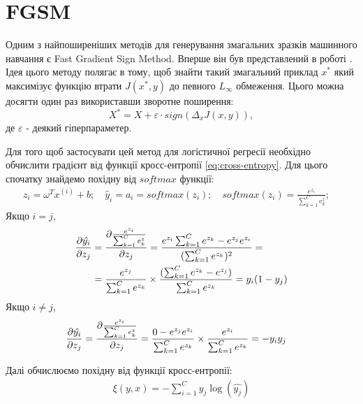 \documentclass[a4paper,14pt]{extreport}
\newcommand{\tran}{^{T}}
\newcommand{\ith}{^{(i)}}
\begin{document}
	\section{FGSM}
	Одним з найпоширеніших методів для генерування змагальних зразків машинного навчання є Fast Gradient Sign Method. Вперше він був представлений в роботі \textcite{goodfellow2014explaining}. Ідея цього методу полягає в тому, щоб знайти такий змагальний приклад $x^{*}$ який максимізує функцію втрати $J(x^{*}, y)$ до певного $L_{\infty}$ обмеження. Цього можна досягти один раз використавши зворотне поширення:
	\begin{equation}
	X^{*} = X + \varepsilon \cdot sign(\Delta_x J(x, y)),
	\end{equation}
	де $\varepsilon$ - деякий гіперпараметер.
	
	Для того щоб застосувати цей метод для логістичної регресії необхідно обчислити градієнт від функції кросс-ентропії \ref{eq:cross-entropy}. Для цього спочатку знайдемо похідну від $softmax$ функції:
	\begin{align*}
		z_i = \omega\tran x\ith + b; \quad
		\hat{y}_i = a_i = softmax(z_i); \quad
		softmax(z_i) = \frac{e^{z_i}}{\sum_{k=1}^{C} e_k^z}; \quad
	\end{align*}
	Якщо $i = j$,
	\begin{align}
	    \pdv{\hat{y_i}}{z_j} 
	    &=
	    \pdv{\frac{e^{z_i}}{\sum_{k=1}^{C} e_k^z}}{z_j} 
	    =
	    \frac{e^{z_i} \sum_{k=1}^{C} e^{z_k} - e^{z_j} e^{z_i}}{(\sum_{k=1}^{C}  e^{z_k})^2} 
	    = \\& =
	    \frac{e^{z_j}}{\sum_{k=1}^{C}  e^{z_k}} \times \frac{(\sum_{k=1}^{C} e^{z_k} - e^{z_j})}{\sum_{k=1}^{C}  e^{z_k}} 
	    = 
	    y_i(1-y_j)
	\end{align}
	Якщо $i \neq j$,
	\begin{align}
		\pdv{\hat{y_i}}{z_j}
		&=
		\pdv{\frac{e^{z_i}}{\sum_{k=1}^{C} e_k^z}}{z_j} 
		=
		\frac{0 - e^{z_j} e^{z_i}}{\sum_{k=1}^{C}  e^{z_k}} \times \frac{e^{z_i}}{\sum_{k=1}^{C} e^{z_k}} 
		= 
		-y_i y_j 
	\end{align}
	
	\begingroup
	\setlength{\abovedisplayskip}{0pt}
	\setlength{\belowdisplayskip}{0pt}
	
	Далі обчислюємо похідну від функції кросс-ентропії:
	\begin{align*}
		\xi(y, x) = - \sum_{i=1}^{C} y_j  \log (\hat{y_j})
	\end{align*}
\end{document}
